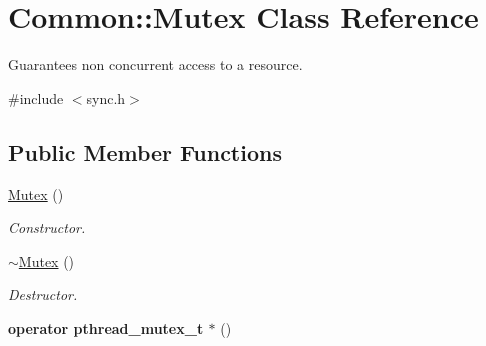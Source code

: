 \hypertarget{class_common_1_1_mutex}{\section{Common\-:\-:Mutex Class Reference}
\label{class_common_1_1_mutex}
}


Guarantees non concurrent access to a resource.  




{\ttfamily \#include $<$sync.\-h$>$}

\subsection*{Public Member Functions}
\begin{DoxyCompactItemize}
\item 
\hyperlink{class_common_1_1_mutex_aad803448fe15d30cb4a2547530dec2d8}{Mutex} ()
\begin{DoxyCompactList}\small\item\em Constructor. \end{DoxyCompactList}\item 
\hypertarget{class_common_1_1_mutex_afbf95aaaee6cd901b93e10b94d9599d4}{\hyperlink{class_common_1_1_mutex_afbf95aaaee6cd901b93e10b94d9599d4}{$\sim$\-Mutex} ()}\label{class_common_1_1_mutex_afbf95aaaee6cd901b93e10b94d9599d4}

\begin{DoxyCompactList}\small\item\em Destructor. \end{DoxyCompactList}\item 
\hypertarget{class_common_1_1_mutex_a117ceec3b486ec875b375114eca81cce}{{\bfseries operator pthread\-\_\-mutex\-\_\-t $\ast$} ()}\label{class_common_1_1_mutex_a117ceec3b486ec875b375114eca81cce}

\end{DoxyCompactItemize}
